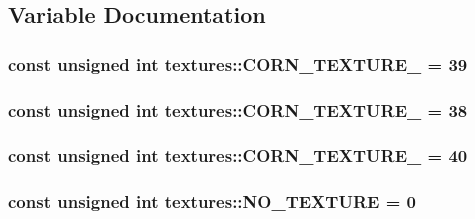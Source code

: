\subsection{Variable Documentation}
\hypertarget{namespacetextures_ad9d822633e938b097758d935dbf7addf}{
\subsubsection[{C\-O\-R\-N\-\_\-\-T\-E\-X\-T\-U\-R\-E\-\_\-1}]{\setlength{\rightskip}{0pt plus 5cm}const unsigned int textures\-::\-C\-O\-R\-N\-\_\-\-T\-E\-X\-T\-U\-R\-E\-\_ = 39}}\label{namespacetextures_ad9d822633e938b097758d935dbf7addf}
\hypertarget{namespacetextures_a4ea11f59a0eb308393ca4a67d75d8e1d}{
\subsubsection[{C\-O\-R\-N\-\_\-\-T\-E\-X\-T\-U\-R\-E\-\_\-2}]{\setlength{\rightskip}{0pt plus 5cm}const unsigned int textures\-::\-C\-O\-R\-N\-\_\-\-T\-E\-X\-T\-U\-R\-E\-\_ = 38}}\label{namespacetextures_a4ea11f59a0eb308393ca4a67d75d8e1d}
\hypertarget{namespacetextures_a1b3b07f0dfd7b82f409765d6153bc641}{
\subsubsection[{C\-O\-R\-N\-\_\-\-T\-E\-X\-T\-U\-R\-E\-\_\-3}]{\setlength{\rightskip}{0pt plus 5cm}const unsigned int textures\-::\-C\-O\-R\-N\-\_\-\-T\-E\-X\-T\-U\-R\-E\-\_ = 40}}\label{namespacetextures_a1b3b07f0dfd7b82f409765d6153bc641}
\hypertarget{namespacetextures_a0441d01cbc4e61c26642f3ae2199ff01}{
\subsubsection[{N\-O\-\_\-\-T\-E\-X\-T\-U\-R\-E}]{\setlength{\rightskip}{0pt plus 5cm}const unsigned int textures\-::\-N\-O\-\_\-\-T\-E\-X\-T\-U\-R\-E = 0}}\label{namespacetextures_a0441d01cbc4e61c26642f3ae2199ff01}
